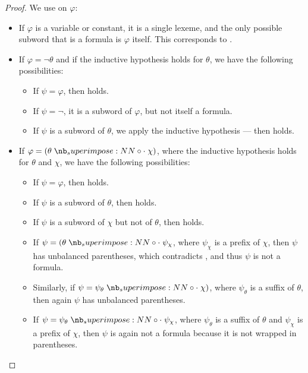\begin{proof}
  We use  on \( \varphi \):
  \begin{itemize}
    \item If \( \varphi \) is a variable or constant, it is a single lexeme, and the only possible subword that is a formula is \( \varphi \) itself. This corresponds to .
    \item If \( \varphi = \neg \theta \) and if the inductive hypothesis holds for \( \theta \), we have the following possibilities:
    \begin{itemize}
      \item If \( \psi = \varphi \), then  holds.
      \item If \( \psi = \neg \), it is a subword of \( \varphi \), but not itself a formula.
      \item If \( \psi \) is a subword of \( \theta \), we apply the inductive hypothesis --- then  holds.
    \end{itemize}

    \item If \( \varphi = (\theta \syncirc \chi) \), where the inductive hypothesis holds for \( \theta \) and \( \chi \), we have the following possibilities:
    \begin{itemize}
      \item If \( \psi = \varphi \), then  holds.
      \item If \( \psi \) is a subword of \( \theta \), then  holds.
      \item If \( \psi \) is a subword of \( \chi \) but not of \( \theta \), then  holds.
      \item If \( \psi = (\theta \syncirc \psi_\chi \), where \( \psi_\chi \) is a prefix of \( \chi \), then \( \psi \) has unbalanced parentheses, which contradicts , and thus \( \psi \) is not a formula.
      \item Similarly, if \( \psi = \psi_\theta \syncirc \chi) \), where \( \psi_\theta \) is a suffix of \( \theta \), then again \( \psi \) has unbalanced parentheses.
      \item If \( \psi = \psi_\theta \syncirc \psi_\chi \), where \( \psi_\theta \) is a suffix of \( \theta \) and \( \psi_\chi \) is a prefix of \( \chi \), then \( \psi \) is again not a formula because it is not wrapped in parentheses.
    \end{itemize}
  \end{itemize}
\end{proof}

